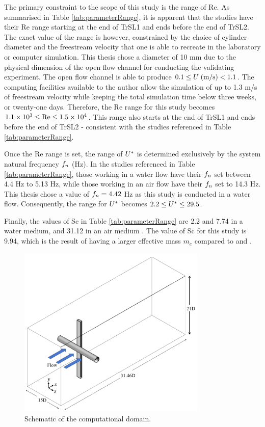 \documentclass[oneside]{utmthesis}
\begin{document}
The primary constraint to the scope of this study is the range of Re. As summarised in Table \ref{tab:parameterRange}, it is apparent that the studies have their Re range starting at the end of TrSL1 and ends before the end of TrSL2. The exact value of the range is however, constrained by the choice of cylinder diameter and the freestream velocity that one is able to recreate in the laboratory or computer simulation. This thesis chose a diameter of 10 mm due to the physical dimension of the open flow channel for conducting the validating experiment. The open flow channel is able to produce $0.1 \leq U \; (\si[per-mode=symbol]{\metre\per\second}) < 1.1$. The computing facilities available to the author allow the simulation of up to 1.3 m/s of freestream velocity while keeping the total simulation time below three weeks, or twenty-one days. Therefore, the Re range for this study becomes $1.1 \times 10^{3} \leq \text{Re} \leq 1.5 \times 10^{4}$. This range also starts at the end of TrSL1 and ends before the end of TrSL2 - consistent with the studies referenced in Table \ref{tab:parameterRange}.

Once the Re range is set, the range of $U^{*}$ is determined exclusively by the system natural frequency $f_{n}$ (Hz). In the studies referenced in Table \ref{tab:parameterRange}, those working in a water flow have their $f_{n}$ set between 4.4 Hz to 5.13 Hz, while those working in an air flow have their $f_{n}$ set to 14.3 Hz. This thesis chose a value of $f_{n} = 4.42$ Hz as this study is conducted in a water flow. Consequently, the range for $U^{*}$ becomes $2.2 \leq U^{*} \leq 29.5$.

Finally, the values of Sc in Table \ref{tab:parameterRange} are 2.2 \citep{Nguyen2012} and 7.74 \citep{Koide2013} in a water medium, and 31.12 in an air medium \citep{Maruai2019}. The value of Sc for this study is 9.94, which is the result of having a larger effective mass $m_{e}$ compared to \citet{Nguyen2012} and \citet{Koide2013}.

\begin{figure}[!h]
  \centering
  \hspace{1cm} \includegraphics[width=0.8\textwidth]{figs/threeDimensionalDomain}
  \caption{Schematic of the computational domain.}
  \label{fig:threeDimDom}
\end{figure}
\end{document}
